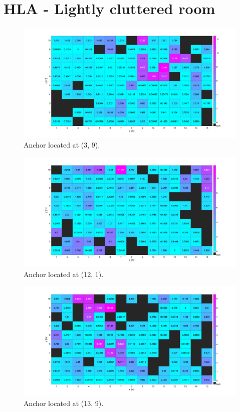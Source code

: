 \chapter{HLA - Lightly cluttered room}
\label{app:hla}
\begin{figure}[H]
\centering
\includegraphics[width=.9\linewidth]{Images/hla_images/hla_anchor_(3_9)_clut.png}
\caption{Anchor located at (3, 9).}
\end{figure}

\begin{figure}[H]
\centering
\includegraphics[width=.9\linewidth]{Images/hla_images/hla_anchor_(12_1)_clut.png}
\caption{Anchor located at (12, 1).}
\end{figure}

\begin{figure}[H]
\centering
\includegraphics[width=.9\linewidth]{Images/hla_images/hla_anchor_(13_9)_clut.png}
\caption{Anchor located at (13, 9).}
\end{figure}

